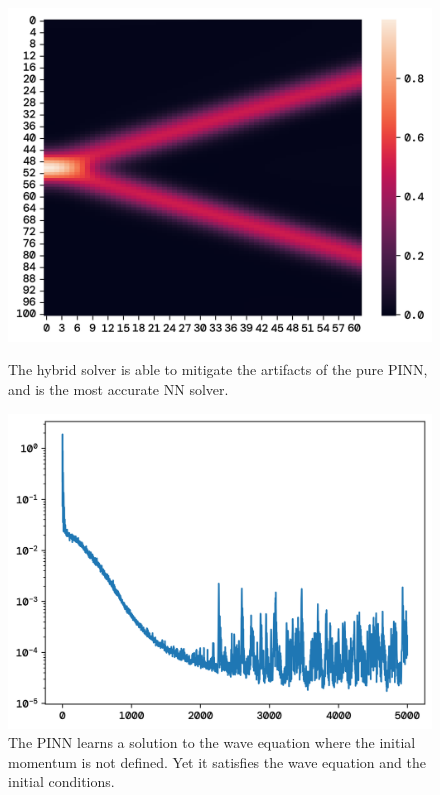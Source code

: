 \documentclass[twoside,11pt]{report}
\begin{document}
    \begin{figure}[!ht]
        \begin{minipage}[t]{0.5\textwidth - 1mm}
            \begin{center}
                \includegraphics[width=\textwidth]{../runsAndFigures/wave_tf_hybrid.png}
            \end{center}
            \caption
            {
                The hybrid solver is able to mitigate the artifacts of the pure PINN, and is the most accurate NN solver.
            }\label{fig:wave_own_dnn}
        \end{minipage}
        \hspace{2mm}
        \begin{minipage}[t]{0.5\textwidth - 1mm}
            \begin{center}
                \includegraphics[width=\textwidth]{../runsAndFigures/wave_tf_hybrid_loss.png}
            \end{center}
            \caption
            {
                The PINN learns a solution to the wave equation where the initial momentum is not defined.
                Yet it satisfies the wave equation and the initial conditions.
            }\label{fig:wave_tf_dnn}
        \end{minipage}
    \end{figure}
\end{document}
